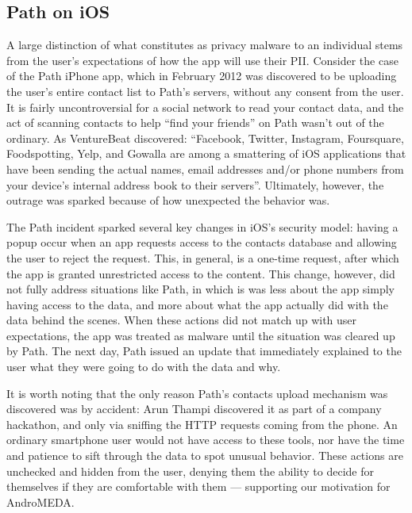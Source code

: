 \subsection{Path on iOS}
\label{sec:path}
A large distinction of what constitutes as privacy malware to an individual stems from the user's expectations of how the app will use their PII. Consider the case of the Path iPhone app, which in February 2012 was discovered to be uploading the user's entire contact list to Path's servers, without any consent from the user\citep{thampi2012}. It is fairly uncontroversial for a social network to read your contact data, and the act of scanning contacts to help ``find your friends'' on Path wasn't out of the ordinary. As VentureBeat discovered: ``Facebook, Twitter, Instagram, Foursquare, Foodspotting, Yelp, and Gowalla are among a smattering of iOS applications that have been sending the actual names, email addresses and/or phone numbers from your device's internal address book to their servers''\citep{vb2012addressbook}. Ultimately, however, the outrage was sparked because of how unexpected the behavior was.

The Path incident sparked several key changes in iOS's security model: having a popup occur when an app requests access to the contacts database and allowing the user to reject the request. This, in general, is a one-time request, after which the app is granted unrestricted access to the content\citep{AppleContacts}. This change, however, did not fully address situations like Path, in which is was less about the app simply having access to the data, and more about what the app actually did with the data behind the scenes. When these actions did not match up with user expectations, the app was treated as malware until the situation was cleared up by Path. The next day, Path issued an update that immediately explained to the user what they were going to do with the data and why.

It is worth noting that the only reason Path's contacts upload mechanism was discovered was by accident: Arun Thampi discovered it as part of a company hackathon, and only via sniffing the HTTP requests coming from the phone. An ordinary smartphone user would not have access to these tools, nor have the time and patience to sift through the data to spot unusual behavior. These actions are unchecked and hidden from the user, denying them the ability to decide for themselves if they are comfortable with them --- supporting our motivation for AndroMEDA.

